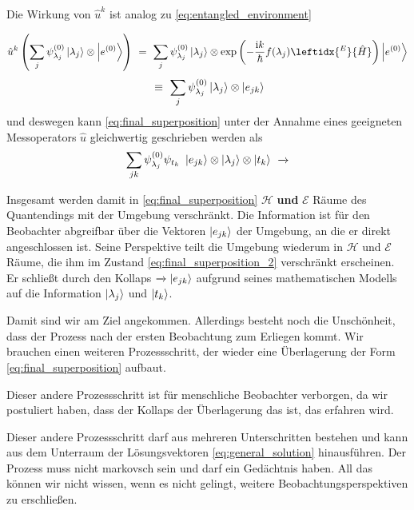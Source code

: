 \documentclass[12pt]{article}
\begin{document}
Die Wirkung von $\hat{u}^k$ ist analog zu \eqref{eq:entangled_environment}

\begin{equation*}
\hat{u}^k\left(\sum_j \psi^{(0)}_{\lambda_j} \ket{\lambda_j}\otimes\ket{e^{(0)}}\right)
\ =\ \sum_j \psi^{(0)}_{\lambda_j} \ket{\lambda_j} 
\otimes \mathrm{exp}\left(-\frac{\mathrm{i}k}{\hbar}f(\lambda_j)\leftidx{^E}{\hat{H}}\right)
\ket{e^{(0)}} 
\end{equation*}
\begin{equation}
\label{eq:entangled_environment_new}
\ \equiv\ 
\sum_j \psi^{(0)}_{\lambda_j} \ket{\lambda_j} 
\otimes \ket{e_{jk}} 
\end{equation}
und deswegen kann \eqref{eq:final_superposition} unter der Annahme eines geeigneten Messoperators $\hat{u}$ gleichwertig geschrieben werden als
\begin{equation}
\label{eq:final_superposition_2}
\sum_{jk} \psi_{\lambda_j}^{(0)}\psi_{t_k}\ \ket{e_{jk}} \otimes \ket{\lambda_j} \otimes \ket{t_k}
\ \xrightarrow{}
\end{equation}

Insgesamt werden damit in \eqref{eq:final_superposition} $\mathscr{H}$ \textbf{und} $\mathscr{E}$ Räume des Quantendings mit der Umgebung verschränkt. Die Information ist für den Beobachter abgreifbar über die Vektoren $\ket{e_{jk}}$ der Umgebung, an die er direkt angeschlossen ist. Seine Perspektive teilt die Umgebung wiederum in $\mathscr{H}$ und $\mathscr{E}$ Räume, die ihm im Zustand \eqref{eq:final_superposition_2} verschränkt erscheinen. Er schließt durch den Kollaps $\xrightarrow{}\ket{e_{jk}}$ aufgrund seines mathematischen Modells auf die Information $\ket{\lambda_j}$ und $\ket{t_k}$.

Damit sind wir am Ziel angekommen. Allerdings besteht noch die Unschönheit, dass der Prozess nach der ersten Beobachtung zum Erliegen kommt. Wir brauchen einen weiteren Prozessschritt, der wieder eine Überlagerung der Form \eqref{eq:final_superposition} aufbaut. 

Dieser andere Prozessschritt ist für menschliche Beobachter verborgen, da wir postuliert haben, dass der Kollaps der Überlagerung das ist, das erfahren wird. 

Dieser andere Prozessschritt darf aus mehreren Unterschritten bestehen und kann aus dem Unterraum der Lösungsvektoren \eqref{eq:general_solution} hinausführen. Der Prozess muss nicht markovsch sein und darf ein Gedächtnis haben. All das können wir nicht wissen, wenn es nicht gelingt, weitere Beobachtungsperspektiven zu erschließen. 
\end{document}
